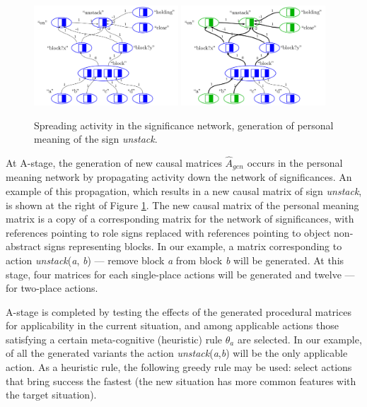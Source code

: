 \documentclass[review]{elsarticle}
\begin{document}
\begin{figure}
	\centering
	\includegraphics[width=0.48\textwidth]{plan_nets-4}
	\includegraphics[width=0.48\textwidth]{plan_nets-3}
	\caption{Spreading activity in the significance network, generation of personal meaning of the sign \textit{unstack}.}	
	\label{fig:unstack_gen}	
\end{figure}

At A-stage, the generation of new causal matrices $\hat A_{gen}$ occurs in the personal meaning network by propagating activity down the network of significances. An example of this propagation, which results in a new causal matrix of sign \textit{unstack}, is shown at the right of Figure \ref{fig:unstack_gen}. The new causal matrix of the personal meaning matrix is a copy of a corresponding matrix for the network of significances, with references pointing to role signs replaced with references pointing to object non-abstract signs representing blocks. In our example, a matrix corresponding to action \textit{unstack}(\textit{a}, \textit{b}) --- remove block \textit{a} from block \textit{b} will be generated. At this stage, four matrices for each single-place actions will be generated and twelve --- for two-place actions.

A-stage is completed by testing the effects of the generated procedural matrices for applicability in the current situation, and among applicable actions those satisfying a certain meta-cognitive (heuristic) rule $\theta_a$ are selected. In our example, of all the generated variants the action \textit{unstack}(\textit{a},\textit{b}) will be the only applicable action. As a heuristic rule, the following greedy rule may be used: select actions that bring success the fastest (the new situation has more common features with the target situation).
\end{document}
